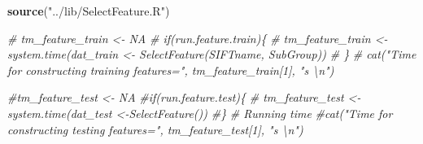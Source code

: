 \documentclass[]{article}
\newenvironment{Shaded}{\begin{snugshade}}{\end{snugshade}}
\newcommand{\KeywordTok}[1]{\textcolor[rgb]{0.13,0.29,0.53}{\textbf{#1}}}
\newcommand{\StringTok}[1]{\textcolor[rgb]{0.31,0.60,0.02}{#1}}
\newcommand{\CommentTok}[1]{\textcolor[rgb]{0.56,0.35,0.01}{\textit{#1}}}
\newcommand{\NormalTok}[1]{#1}
\begin{document}
\begin{Shaded}
\begin{Highlighting}[]
\KeywordTok{source}\NormalTok{(}\StringTok{"../lib/SelectFeature.R"}\NormalTok{)}

\CommentTok{# tm_feature_train <- NA}
\CommentTok{# if(run.feature.train)\{}
\CommentTok{#   tm_feature_train <- system.time(dat_train <- SelectFeature(SIFTname, SubGroup))}
\CommentTok{# \}}
\CommentTok{# cat("Time for constructing training features=", tm_feature_train[1], "s \textbackslash{}n")}

\CommentTok{#tm_feature_test <- NA}
\CommentTok{#if(run.feature.test)\{}
\CommentTok{#  tm_feature_test <- system.time(dat_test <-SelectFeature())}
\CommentTok{#\}}
\CommentTok{# Running time}
\CommentTok{#cat("Time for constructing testing features=", tm_feature_test[1], "s \textbackslash{}n")}


\end{Highlighting}
\end{Shaded}
\end{document}
